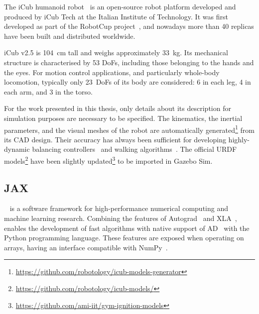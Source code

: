 The iCub humanoid robot~\parencite{natale_icub_2017} is an open-source robot platform developed and produced by iCub Tech at the Italian Institute of Technology.
It was first developed as part of the RobotCup project~\parencite{metta_open_2005}, and nowadays more than 40 replicas have been built and distributed worldwide.

iCub v2.5 is 104~cm tall and weighs approximately 33~kg.
Its mechanical structure is characterised by 53 \acp{DoF}, including those belonging to the hands and the eyes.
For motion control applications, and particularly whole-body locomotion, typically only 23~\acp{DoF} of its body are considered: 6 in each leg, 4 in each arm, and 3 in the torso.

For the work presented in this thesis, only details about its description for simulation purposes are necessary to be specified.
The kinematics, the inertial parameters, and the visual meshes of the robot are automatically generated\footnote{\url{https://github.com/robotology/icub-models-generator}} from its CAD design.
Their accuracy has always been sufficient for developing highly-dynamic balancing controllers~\parencite{pucci_highly_2016} and walking algorithms~\parencite{dafarra_control_2018}.
The official \ac{URDF} models\footnote{\url{https://github.com/robotology/icub-models/}} have been slightly updated\footnote{\url{https://github.com/ami-iit/gym-ignition-models}} to be imported in Gazebo Sim.

\subsection{JAX}

\jax~\parencite{frostig_compiling_2018, bradbury_james_jax_2018} is a software framework for high-performance numerical computing and machine learning research.
Combining the features of Autograd~\parencite{maclaurin_autograd_2015} and \ac{XLA}~\parencite{sabne_xla_2020}, \jax enables the development of fast algorithms with native support of \ac{AD}~\parencite{baydin_automatic_2018} with the Python programming language.
These features are exposed when operating on \jax arrays, having an interface compatible with NumPy~\parencite{harris_array_2020}.

